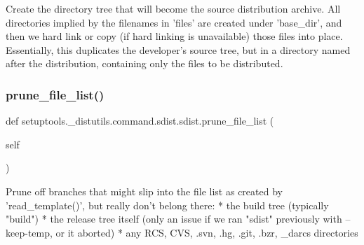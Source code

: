 \begin{DoxyVerb}Create the directory tree that will become the source
distribution archive.  All directories implied by the filenames in
'files' are created under 'base_dir', and then we hard link or copy
(if hard linking is unavailable) those files into place.
Essentially, this duplicates the developer's source tree, but in a
directory named after the distribution, containing only the files
to be distributed.
\end{DoxyVerb}
 \mbox{\label{classsetuptools_1_1__distutils_1_1command_1_1sdist_1_1sdist_aaf5f67563ff6c6b220f67220420d8078}} 
\subsubsection{\texorpdfstring{prune\+\_\+file\+\_\+list()}{prune\_file\_list()}}
{\footnotesize\ttfamily def setuptools.\+\_\+distutils.\+command.\+sdist.\+sdist.\+prune\+\_\+file\+\_\+list (\begin{DoxyParamCaption}\item[{}]{self }\end{DoxyParamCaption})}

\begin{DoxyVerb}Prune off branches that might slip into the file list as created
by 'read_template()', but really don't belong there:
  * the build tree (typically "build")
  * the release tree itself (only an issue if we ran "sdist"
    previously with --keep-temp, or it aborted)
  * any RCS, CVS, .svn, .hg, .git, .bzr, _darcs directories
\end{DoxyVerb}
 \mbox{\label{classsetuptools_1_1__distutils_1_1command_1_1sdist_1_1sdist_acf519846fd90bf80dc9503ed76c3b2b1}} 
